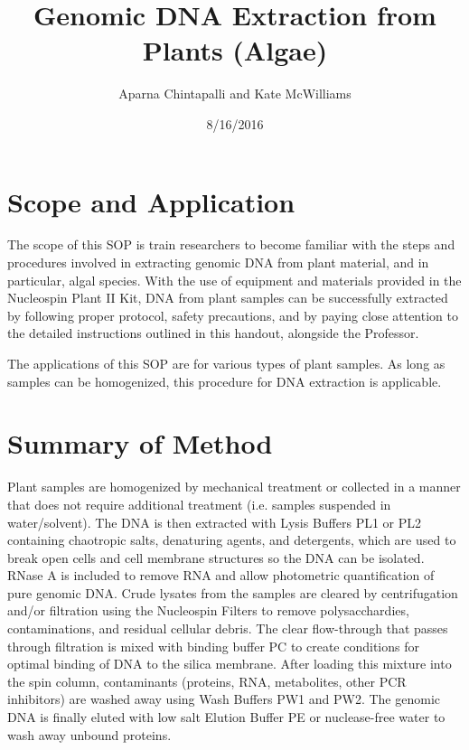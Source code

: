 \documentclass[12pt]{../SOP3_alpha}\usepackage[]{graphicx}\usepackage[]{color}
\title{Genomic DNA Extraction from Plants (Algae)}
\date{8/16/2016}
\author{Aparna Chintapalli and Kate McWilliams}
\begin{document}

\maketitle

\section{Scope and Application}

\NP The scope of this SOP is train researchers to become familiar with the steps and procedures involved in extracting genomic DNA from plant material, and in particular, algal species. With the use of equipment and materials provided in the Nucleospin Plant II Kit, DNA from plant samples can be successfully extracted by following proper protocol, safety precautions, and by paying close attention to the detailed instructions outlined in this handout, alongside the Professor. 

\NP The applications of this SOP are for various types of plant samples. As long as samples can be homogenized, this procedure for DNA extraction is applicable. 

\section{Summary of Method}

\NP Plant samples are homogenized by mechanical treatment or collected in a manner that does not require additional treatment (i.e. samples suspended in water/solvent). The DNA is then extracted with Lysis Buffers PL1 or PL2 containing chaotropic salts, denaturing agents, and detergents, which are used to break open cells and cell membrane structures so the DNA can be isolated. RNase A is included to remove RNA and allow photometric quantification of pure genomic DNA. Crude lysates from the samples are cleared by centrifugation and/or filtration using the Nucleospin Filters to remove polysacchardies, contaminations, and residual cellular debris. The clear flow-through that passes through filtration is mixed with binding buffer PC to create conditions for optimal binding of DNA to the silica membrane. After loading this mixture into the spin column, contaminants (proteins, RNA, metabolites, other PCR inhibitors) are washed away using Wash Buffers PW1 and PW2. The genomic DNA is finally eluted with low salt Elution Buffer PE or nuclease-free water to wash away unbound proteins.
\end{document}

